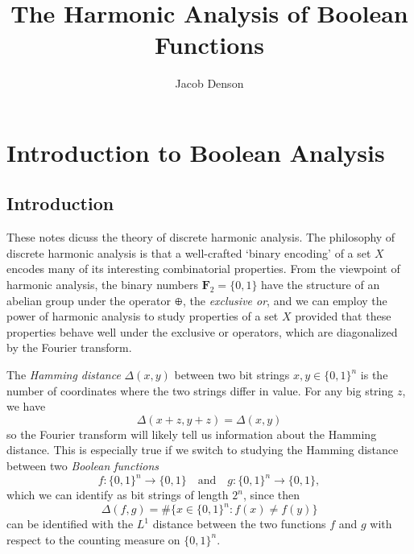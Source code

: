 

\title{The Harmonic Analysis of Boolean Functions}
\author{Jacob Denson}




\maketitle

\tableofcontents


\chapter{Introduction to Boolean Analysis}

\section{Introduction}

These notes dicuss the theory of discrete harmonic analysis. The philosophy of discrete harmonic analysis is that a well-crafted `binary encoding' of a set $X$ encodes many of its interesting combinatorial properties. From the viewpoint of harmonic analysis, the binary numbers $\mathbf{F}_2 = \{ 0, 1 \}$ have the structure of an abelian group under the operator $\oplus$, the \emph{exclusive or}, and we can employ the power of harmonic analysis to study properties of a set $X$ provided that these properties behave well under the exclusive or operators, which are diagonalized by the Fourier transform.

\begin{example}
    The \emph{Hamming distance} $\Delta(x,y)$ between two bit strings $x, y \in \{ 0, 1 \}^n$ is the number of coordinates where the two strings differ in value. For any big string $z$, we have
    \[ \Delta(x + z, y + z) = \Delta(x,y) \]
    so the Fourier transform will likely tell us information about the Hamming distance. This is especially true if we switch to studying the Hamming distance between two \emph{Boolean functions}
    \[ f: \{ 0, 1 \}^n \to \{ 0, 1 \} \quad\text{and}\quad g: \{ 0, 1 \}^n \to \{ 0, 1 \}, \]
    which we can identify as bit strings of length $2^n$, since then
    \[ \Delta(f,g) = \# \{ x \in \{ 0, 1 \}^n : f(x) \neq f(y) \} \]
    can be identified with the $L^1$ distance between the two functions $f$ and $g$ with respect to the counting measure on $\{ 0, 1 \}^n$.
\end{example}

